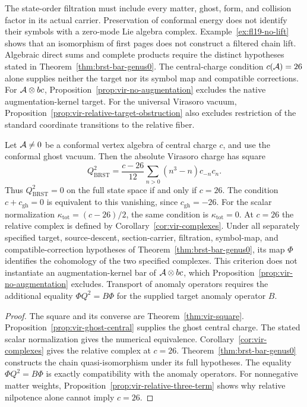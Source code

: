 \begin{remark}
\label{rem:brst-bar-scope}
The state-order filtration must include every matter, ghost, form, and collision factor in its actual carrier.
Preservation of conformal energy does not identify their symbols with a zero-mode Lie algebra complex.
Example~\ref{ex:fl19-no-lift} shows that an isomorphism of first pages does not construct a filtered chain lift.
Algebraic direct sums and complete products require the distinct hypotheses stated in Theorem~\ref{thm:brst-bar-genus0}.
The central-charge condition $c(\mathcal{A})=26$ alone supplies neither the target nor its symbol map and compatible corrections.
For $\mathcal{A}\otimes bc$, Proposition~\ref{prop:vir-no-augmentation} excludes the native augmentation-kernel target.
For the universal Virasoro vacuum, Proposition~\ref{prop:vir-relative-target-obstruction} also excludes restriction of the standard coordinate transitions to the relative fiber.
\end{remark}

\begin{corollary}
\label{cor:anomaly-physical-genus0}
Let $\mathcal{A}\neq0$ be a conformal vertex algebra of central charge $c$, and use the conformal ghost vacuum.
Then the absolute Virasoro charge has square
\[
 Q_{\mathrm{BRST}}^2=\frac{c-26}{12}\sum_{n>0}(n^3-n)c_{-n}c_n.
\]
Thus $Q_{\mathrm{BRST}}^2=0$ on the full state space if and only if $c=26$.
The condition $c+c_{\mathrm{gh}}=0$ is equivalent to this vanishing, since $c_{\mathrm{gh}}=-26$.
For the scalar normalization $\kappa_{\mathrm{tot}}=(c-26)/2$, the same condition is $\kappa_{\mathrm{tot}}=0$.
At $c=26$ the relative complex is defined by Corollary~\ref{cor:vir-complexes}.
Under all separately specified target, source-descent, section-carrier, filtration, symbol-map, and compatible-correction hypotheses of Theorem~\ref{thm:brst-bar-genus0}, its map $\Phi$ identifies the cohomology of the two specified complexes.
This criterion does not instantiate an augmentation-kernel bar of $\mathcal{A}\otimes bc$, which Proposition~\ref{prop:vir-no-augmentation} excludes.
Transport of anomaly operators requires the additional equality
$\Phi Q^2=B\Phi$ for the supplied target anomaly operator $B$.
\end{corollary}

\begin{proof}
The square and its converse are Theorem~\ref{thm:vir-square}.
Proposition~\ref{prop:vir-ghost-central} supplies the ghost central charge.
The stated scalar normalization gives the numerical equivalence.
Corollary~\ref{cor:vir-complexes} gives the relative complex at $c=26$.
Theorem~\ref{thm:brst-bar-genus0} constructs the chain quasi-isomorphism under its full hypotheses.
The equality $\Phi Q^2=B\Phi$ is exactly compatibility with the anomaly operators.
For nonnegative matter weights, Proposition~\ref{prop:vir-relative-three-term} shows why relative nilpotence alone cannot imply $c=26$.
\end{proof}

